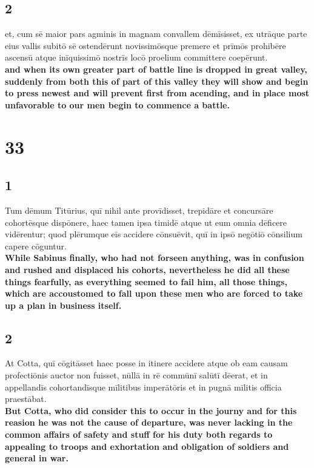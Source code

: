 \documentclass{article}
\begin{document}
\subsection*{2}
et, cum sē maior pars agminis in magnam convallem dēmīsisset, ex utrāque parte eius vallis subitō sē ostendērunt novissimōsque premere et prīmōs prohibēre ascensū atque inīquissimō nostrīs locō proelium committere coepērunt.\\
\textbf{and when its own greater part of battle line is dropped in great valley, suddenly from both this of part of this valley they will show and begin to press newest and will prevent first from acending, and in place most unfavorable to our men begin to commence a battle.  }

\break

\section*{33}

\subsection*{1}
Tum dēmum Titūrius, quī nihil ante provīdisset, trepidāre et concursāre cohortēsque dispōnere, haec tamen ipsa timidē atque ut eum omnia dēficere vidērentur; quod plērumque eīs accidere cōnsuēvit, quī in ipsō negōtiō cōnsilium capere cōguntur. \\
\textbf{While Sabinus finally, who had not forseen anything, was in confusion and rushed and displaced his cohorts, nevertheless he did all these things fearfully, as everything seemed to fail him, all those things, which are accoustomed to fall upon these men who are forced to take up a plan in business itself.}

\subsection*{2}
At Cotta, quī cōgitāsset haec posse in itinere accidere atque ob eam causam profectiōnis auctor non fuisset, nūllā in rē commūnī salūtī dēerat, et in appellandīs cohortandīsque mīlitibus imperātōris et in pugnā mīlitis officia praestābat. \\
\textbf{But Cotta, who did consider this to occur in the journy and for this reasion he was not the cause of departure, was never lacking in the common affairs of safety and stuff for his duty both regards to appealing to troops and exhortation and obligation of soldiers and general in war.}
\end{document}
